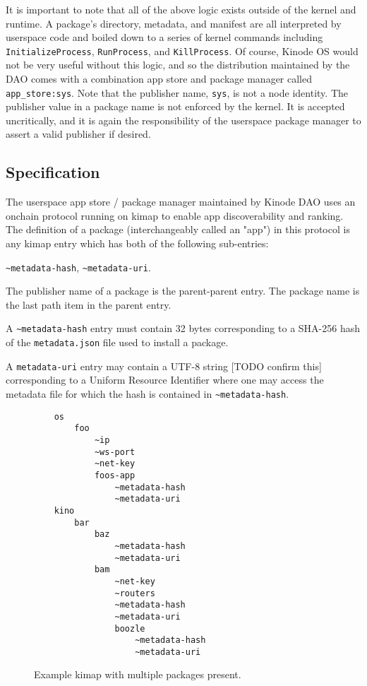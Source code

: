 \documentclass[runningheads]{llncs}
\begin{document}
It is important to note that all of the above logic exists outside of the kernel and runtime.
A package's directory, metadata, and manifest are all interpreted by userspace code and boiled down to a series of kernel commands including \verb|InitializeProcess|, \verb|RunProcess|, and \verb|KillProcess|.
Of course, Kinode OS would not be very useful without this logic, and so the distribution maintained by the DAO comes with a combination app store and package manager called \verb|app_store:sys|.
Note that the publisher name, \verb|sys|, is not a node identity.
The publisher value in a package name is not enforced by the kernel.
It is accepted uncritically, and it is again the responsibility of the userspace package manager to assert a valid publisher if desired.

\subsection{Specification}

The userspace app store / package manager maintained by Kinode DAO uses an onchain protocol running on kimap to enable app discoverability and ranking.
The definition of a package (interchangeably called an "app") in this protocol is any kimap entry which has both of the following sub-entries:

\verb|~metadata-hash|, \verb|~metadata-uri|.

The publisher name of a package is the parent-parent entry.
The package name is the last path item in the parent entry.

A \verb|~metadata-hash| entry must contain 32 bytes corresponding to a SHA-256 hash of the \verb|metadata.json| file used to install a package.

A \verb|metadata-uri| entry may contain a UTF-8 string [TODO confirm this] corresponding to a Uniform Resource Identifier where one may access the metadata file for which the hash is contained in \verb|~metadata-hash|.

\begin{figure}[H]
    \centering
    \begin{lstlisting}
    os
        foo
            ~ip
            ~ws-port
            ~net-key
            foos-app
                ~metadata-hash
                ~metadata-uri
    kino
        bar
            baz
                ~metadata-hash
                ~metadata-uri
            bam
                ~net-key
                ~routers
                ~metadata-hash
                ~metadata-uri
                boozle
                    ~metadata-hash
                    ~metadata-uri
    \end{lstlisting}
    \caption{Example kimap with multiple packages present.}
    \label{fig:example kimap with packages}
\end{figure}
\end{document}
